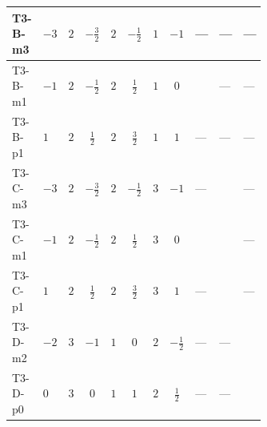 \documentclass[8pt]{article}
\begin{document}
\begin{landscape}
\begin{longtable}{@{}llcccccc >{\raggedright\arraybackslash}p{0.21\linewidth} >{\raggedright\arraybackslash}p{0.21\linewidth} >{\raggedright\arraybackslash}p{0.21\linewidth}@{}}
\midrule
T3-B-m3 & $-3$ & $2$ & $-\frac{3}{2}$ & $2$ & $-\frac{1}{2}$ & $1$ & $-1$ & --- & --- & --- \\
\midrule
T3-B-m1 & $-1$ & $2$ & $-\frac{1}{2}$ & $2$ & $\frac{1}{2}$ & $1$ & $0$ & \scriptsize\adjustbox{max width=\linewidth}{$\begin{gathered} -8 \operatorname{Tr}\!\left({M_F}\,\left({y_2}\right)^{\dagger}\,{y_2}\,\left({M_F}\right)^{*}\right)\end{gathered}$} & --- & --- \\
\midrule
T3-B-p1 & $1$ & $2$ & $\frac{1}{2}$ & $2$ & $\frac{3}{2}$ & $1$ & $1$ & --- & --- & --- \\
\midrule
T3-C-m3 & $-3$ & $2$ & $-\frac{3}{2}$ & $2$ & $-\frac{1}{2}$ & $3$ & $-1$ & --- & \scriptsize\adjustbox{max width=\linewidth}{$\begin{gathered} {m_2^2} (3 T_{\nu}^{(2)}+6 {\lambda_{S_2}^{(1)}})\end{gathered}$} & --- \\
\midrule
T3-C-m1 & $-1$ & $2$ & $-\frac{1}{2}$ & $2$ & $\frac{1}{2}$ & $3$ & $0$ & \scriptsize\adjustbox{max width=\linewidth}{$\begin{gathered} -12 \operatorname{Tr}\!\left({M_F}\,\left({y_2}\right)^{\dagger}\,{y_2}\,\left({M_F}\right)^{*}\right)\end{gathered}$} & \scriptsize\adjustbox{max width=\linewidth}{$\begin{gathered} {m_2^2} (3 T_{\nu}^{(2)}+6 {\lambda_{S_2}^{(1)}})\end{gathered}$} & --- \\
\midrule
T3-C-p1 & $1$ & $2$ & $\frac{1}{2}$ & $2$ & $\frac{3}{2}$ & $3$ & $1$ & --- & \scriptsize\adjustbox{max width=\linewidth}{$\begin{gathered} {m_2^2} (3 T_{\nu}^{(2)}+6 {\lambda_{S_2}^{(1)}})\end{gathered}$} & --- \\
\midrule
T3-D-m2 & $-2$ & $3$ & $-1$ & $1$ & $0$ & $2$ & $-\frac{1}{2}$ & --- & --- & \scriptsize\adjustbox{max width=\linewidth}{$\begin{gathered} {m_2^2} (4 T_{\nu}^{(2)}+4 {\lambda_{S_2}^{(1)}})\end{gathered}$} \\
\midrule
T3-D-p0 & $0$ & $3$ & $0$ & $1$ & $1$ & $2$ & $\frac{1}{2}$ & --- & --- & \scriptsize\adjustbox{max width=\linewidth}{$\begin{gathered} {m_2^2} (4 T_{\nu}^{(2)}+4 {\lambda_{S_2}^{(1)}})\end{gathered}$} \\

\end{longtable}
\end{landscape}
\end{document}
